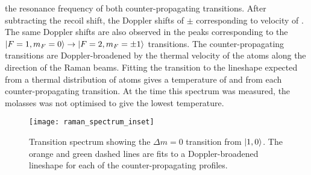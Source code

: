 the resonance frequency of both counter-propagating transitions.
After subtracting the recoil shift, the Doppler shifts of
$\pm$ corresponding to
velocity of . The same Doppler shifts are also
observed in the peaks corresponding to the \(\ket{F=1,m_F = 0}
\rightarrow \ket{F=2,m_F=\pm 1}\) transitions. The counter-propagating transitions are
Doppler-broadened by the thermal velocity of the atoms along the direction
of the Raman beams. 
Fitting the transition to the lineshape expected
from a thermal distribution of atoms gives a temperature of
 and  from
each counter-propagating transition. At the time this spectrum was
measured, the molasses was not optimised to give the lowest
temperature.
\begin{figure}[htpb!]
  \centering
  \texttt{[image: raman\_spectrum\_inset]}
  \caption[\(\Delta m = 0\) transition spectrum.]{Transition spectrum showing the \(\Delta m = 0\) transition
  from \(\ket{1,0}\). The orange and green dashed lines are fits to a
Doppler-broadened lineshape for each of the counter-propagating
profiles.}
  \label{fig:raman_spectrum_inset}
\end{figure}

